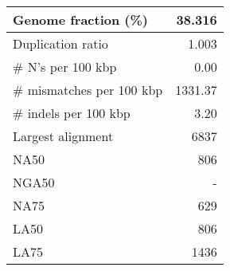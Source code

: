 \documentclass[12pt,a4paper]{article}
\begin{document}
\begin{table}[ht]
\begin{center}
\begin{tabular}{|l*{1}{|r}|}
Genome fraction (\%) & 38.316 \\ \hline
Duplication ratio & 1.003 \\ \hline
\# N's per 100 kbp & 0.00 \\ \hline
\# mismatches per 100 kbp & 1331.37 \\ \hline
\# indels per 100 kbp & 3.20 \\ \hline
Largest alignment & 6837 \\ \hline
NA50 & 806 \\ \hline
NGA50 & - \\ \hline
NA75 & 629 \\ \hline
LA50 & 806 \\ \hline
LA75 & 1436 \\ \hline
\end{tabular}
\end{center}
\end{table}
\end{document}

